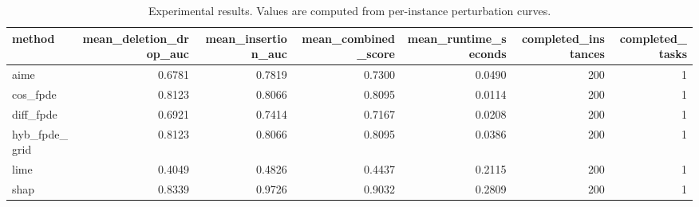 \begin{table}[t]
\caption{Experimental results. Values are computed from per-instance perturbation curves.}
\label{tab:main_results_computed}
\centering
\begin{tabular}{lrrrrrr}
\toprule
method & mean\_deletion\_drop\_auc & mean\_insertion\_auc & mean\_combined\_score & mean\_runtime\_seconds & completed\_instances & completed\_tasks \\
\midrule
aime & 0.6781 & 0.7819 & 0.7300 & 0.0490 & 200 & 1 \\
cos\_fpde & 0.8123 & 0.8066 & 0.8095 & 0.0114 & 200 & 1 \\
diff\_fpde & 0.6921 & 0.7414 & 0.7167 & 0.0208 & 200 & 1 \\
hyb\_fpde\_grid & 0.8123 & 0.8066 & 0.8095 & 0.0386 & 200 & 1 \\
lime & 0.4049 & 0.4826 & 0.4437 & 0.2115 & 200 & 1 \\
shap & 0.8339 & 0.9726 & 0.9032 & 0.2809 & 200 & 1 \\
\bottomrule
\end{tabular}

\end{table}
